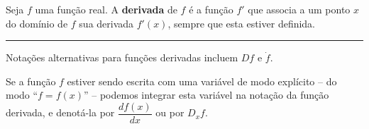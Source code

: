 \begin{definition}
	Seja $f$ uma função real. A \textbf{derivada} de $f$ é a função $f'$ que associa a um ponto $x$ do domínio de $f$ sua derivada $f'(x)$, sempre que esta estiver definida.
	
	\hrule
	
	Notações alternativas para funções derivadas incluem $Df$ e $\dot{f}$.

	Se a função $f$ estiver sendo escrita com uma variável de modo explícito -- do modo ``$f=f(x)$'' -- podemos integrar esta variável na notação da função derivada, e denotá-la por $\dfrac{df(x)}{dx}$ ou por $D_xf$.
\end{definition}